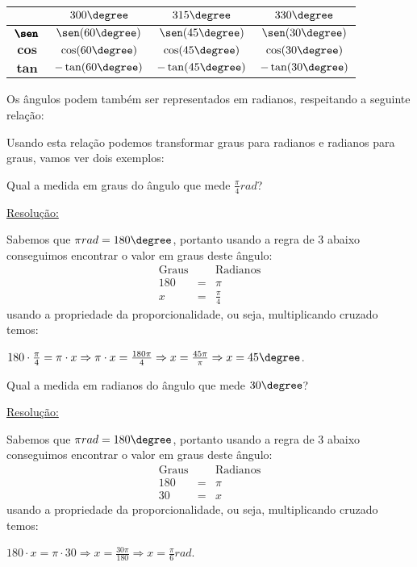  \begin{table}[H]
 \centering
 \begin{tabular}{|c|c|c|c|} \hline
 \rowcolor{cinza}
               & $300\degree$ & $315\degree$ & $330\degree$ \\\hline
  $\pmb{\sen}$ & $\sen(60\degree)$ & $\sen(45\degree)$ & $\sen(30\degree)$ \\\hline
  $\pmb{\cos}$ & $\cos(60\degree)$ & $\cos(45\degree)$ & $\cos(30\degree)$  \\\hline
  $\pmb{\tan}$ & $-\tan(60\degree)$ & $-\tan(45\degree)$ & $-\tan(30\degree)$  \\\hline
 \end{tabular}
\end{table}


  Os ângulos podem também ser representados em radianos, respeitando a seguinte relação:

  Usando esta relação podemos transformar graus para radianos e radianos para graus, vamos ver dois exemplos:

  \begin{exem}
   Qual a medida em graus do ângulo que mede $\frac{\pi}{4} rad$?

   \underline{Resolução:}

   Sabemos que $\pi rad= 180\degree$, portanto usando a regra de 3 abaixo conseguimos encontrar o valor em graus deste ângulo:
   \begin{eqnarray*}
  \text{Graus} & & \text{Radianos} \\
   180 & = & \pi\\
  x & = & \frac{\pi}{4}
 \end{eqnarray*}
 usando a propriedade da proporcionalidade, ou seja, multiplicando cruzado temos:

 $180 \cdot \frac{\pi}{4}= \pi \cdot x \Rightarrow \pi \cdot x= \frac{180 \pi}{4} \Rightarrow x= \frac{45 \pi}{\pi} \Rightarrow x= 45\degree$.

 \fim
  \end{exem}

  \begin{exem}
   Qual a medida em radianos do ângulo que mede $30\degree$?

   \underline{Resolução:}

   Sabemos que $\pi rad= 180\degree$, portanto usando a regra de 3 abaixo conseguimos encontrar o valor em graus deste ângulo:
   \begin{eqnarray*}
  \text{Graus} & & \text{Radianos} \\
   180 & = & \pi\\
  30 & = & x
 \end{eqnarray*}
 usando a propriedade da proporcionalidade, ou seja, multiplicando cruzado temos:

 $180 \cdot x= \pi \cdot 30 \Rightarrow x= \frac{30 \pi}{180} \Rightarrow x= \frac{\pi}{6} rad$.

 \fim
  \end{exem}

